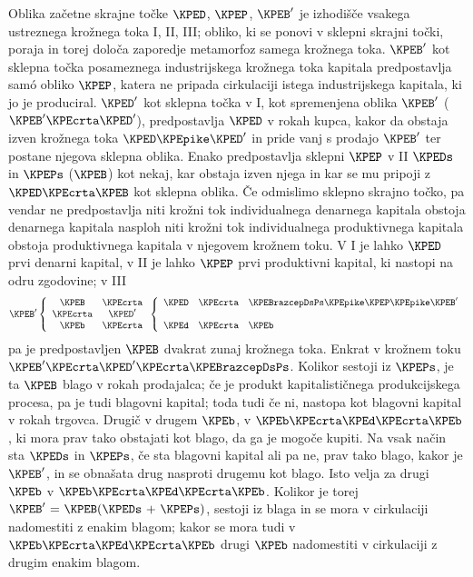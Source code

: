\documentclass[kapital_02.tex]{subfiles}
\begin{document}
Oblika začetne skrajne točke \( \KPED \), \( \KPEP \), \( \KPEB' \) je izhodišče vsakega ustreznega krožnega toka I, II, III; obliko, ki se ponovi v sklepni skrajni točki, poraja in torej določa zaporedje metamorfoz samega krožnega toka. \( \KPEB' \) kot sklepna točka posameznega industrijskega krožnega toka kapitala predpostavlja sam\'o obliko \( \KPEP \), katera ne pripada cirkulaciji istega industrijskega kapitala, ki jo je produciral. \( \KPED' \) kot sklepna točka v I, kot spremenjena oblika \( \KPEB' \) (\( \KPEB' \KPEcrta \KPED' \)), predpostavlja \( \KPED \) v rokah kupca, kakor da obstaja izven krožnega toka \( \KPED \KPEpike \KPED' \) in pride vanj s prodajo \( \KPEB' \) ter postane njegova sklepna oblika. Enako predpostavlja sklepni \( \KPEP \) v II \( \KPEDs \) in \( \KPEPs \) (\( \KPEB \)) kot nekaj, kar obstaja izven njega in kar \KPEstran se mu pripoji z \( \KPED \KPEcrta \KPEB \) kot sklepna oblika. Če odmislimo sklepno skrajno točko, pa vendar ne predpostavlja niti krožni tok individualnega denarnega kapitala obstoja denarnega kapitala nasploh niti krožni tok individualnega produktivnega kapitala obstoja produktivnega kapitala v njegovem krožnem toku. V I je lahko \( \KPED \) prvi denarni kapital, v II je lahko \( \KPEP \) prvi produktivni kapital, ki nastopi na odru zgodovine; v III \[
    \KPEB'
    \left\lbrace
    \begin{array}{c c}
        \KPEB & \KPEcrta \\
        \KPEcrta & \KPED' \\
        \KPEb & \KPEcrta \\
    \end{array}
    \right.
    \left\lbrace
    \begin{array}{c c l}
        \KPED & \KPEcrta & \KPEBrazcepDsPs \KPEpike \KPEP \KPEpike \KPEB' \\
         & & \\
        \KPEd & \KPEcrta & \KPEb \\
    \end{array}
    \right.
\] pa je predpostavljen \( \KPEB \) dvakrat zunaj krožnega toka. Enkrat v krožnem toku \( \KPEB' \KPEcrta \KPED' \KPEcrta \KPEBrazcepDsPs \). Kolikor sestoji iz \( \KPEPs \), je ta \( \KPEB \) blago v rokah prodajalca; če je produkt kapitalističnega produkcijskega procesa, pa je tudi blagovni kapital; toda tudi če ni, nastopa kot blagovni kapital v rokah trgovca. Drugič v drugem \( \KPEb \), v \( \KPEb \KPEcrta \KPEd \KPEcrta \KPEb \), ki mora prav tako obstajati kot blago, da ga je mogoče kupiti. Na vsak način sta \( \KPEDs \) in \( \KPEPs \), če sta blagovni kapital ali pa ne, prav tako blago, kakor je \( \KPEB' \), in se obnašata drug nasproti drugemu kot blago. Isto velja za drugi \( \KPEb \) v \( \KPEb \KPEcrta \KPEd \KPEcrta \KPEb \). Kolikor je torej \( \KPEB' \textrm{ = } \KPEB ( \KPEDs \textrm{ + } \KPEPs ) \), sestoji iz blaga in se mora v cirkulaciji nadomestiti z enakim blagom; kakor se mora tudi v \( \KPEb \KPEcrta \KPEd \KPEcrta \KPEb \) drugi \( \KPEb \) nadomestiti v cirkulaciji z drugim enakim blagom.
\end{document}
